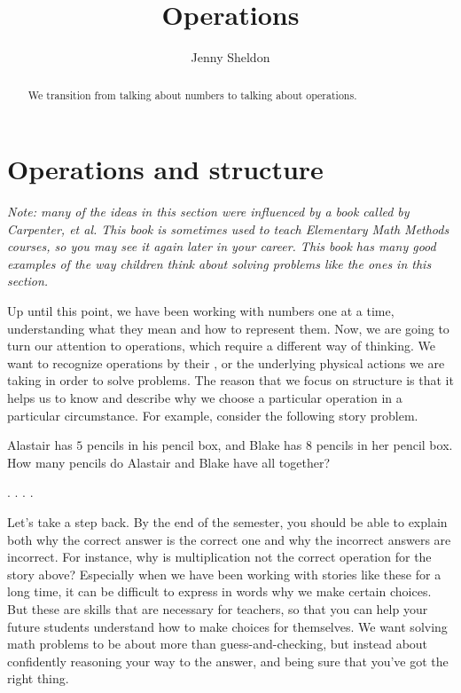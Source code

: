 \documentclass{ximera}
\title{Operations}
\author{Jenny Sheldon}
\begin{document}
\begin{abstract}
We transition from talking about numbers to talking about operations.
\end{abstract}
\maketitle



\section{Operations and structure}

\emph{Note: many of the ideas in this section were influenced by a book called  by Carpenter, et al. This book is sometimes used to teach Elementary Math Methods courses, so you may see it again later in your career. This book has many good examples of the way children think about solving problems like the ones in this section.}

Up until this point, we have been working with numbers one at a time, understanding what they mean and how to represent them. Now, we are going to turn our attention to operations, which require a different way of thinking. We want to recognize operations by their , or the underlying physical actions we are taking in order to solve problems. The reason that we focus on structure is that it helps us to know and describe why we choose a particular operation in a particular circumstance. For example, consider the following story problem.

\begin{question}
Alastair has $5$ pencils in his pencil box, and Blake has $8$ pencils in her pencil box. How many pencils do Alastair and Blake have all together?

\begin{multipleChoice}
.
.
.
.
\end{multipleChoice}
\end{question}

Let's take a step back. By the end of the semester, you should be able to explain both why the correct answer is the correct one and why the incorrect answers are incorrect. For instance, why is multiplication not the correct operation for the story above? Especially when we have been working with stories like these for a long time, it can be difficult to express in words why we make certain choices. But these are skills that are necessary for teachers, so that you can help your future students understand how to make choices for themselves. We want solving math problems to be about more than guess-and-checking, but instead about confidently reasoning your way to the answer, and being sure that you've got the right thing.
\end{document}
